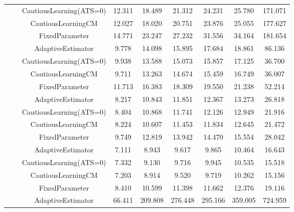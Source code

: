 \begin{table}[!h]
\begin{tabular}[t]{ccccccccc}
 &  & CautiousLearning(ATS=0) & 12.311 & 18.489 & 21.312 & 24.231 & 25.780 & 171.071\\

 &  & CautiousLearningCM & 12.027 & 18.020 & 20.751 & 23.876 & 25.055 & 177.627\\

 & \multirow[t]{-4}{*}{\centering\arraybackslash 0.75} & FixedParameter & 14.771 & 23.247 & 27.232 & 31.556 & 34.164 & 181.654\\
\cmidrule{2-9}
 &  & AdaptiveEstimator & 9.778 & 14.098 & 15.895 & 17.684 & 18.861 & 86.136\\

 &  & CautiousLearning(ATS=0) & 9.938 & 13.588 & 15.073 & 15.857 & 17.125 & 36.700\\

 &  & CautiousLearningCM & 9.711 & 13.263 & 14.674 & 15.459 & 16.749 & 36.007\\

 & \multirow[t]{-4}{*}{\centering\arraybackslash 1.00} & FixedParameter & 11.713 & 16.383 & 18.309 & 19.550 & 21.238 & 52.214\\
\cmidrule{2-9}
 &  & AdaptiveEstimator & 8.217 & 10.843 & 11.851 & 12.367 & 13.273 & 26.818\\

 &  & CautiousLearning(ATS=0) & 8.404 & 10.868 & 11.741 & 12.126 & 12.949 & 21.916\\

 &  & CautiousLearningCM & 8.224 & 10.607 & 11.453 & 11.834 & 12.645 & 21.472\\

 & \multirow[t]{-4}{*}{\centering\arraybackslash 1.25} & FixedParameter & 9.749 & 12.819 & 13.942 & 14.470 & 15.554 & 28.042\\
\cmidrule{2-9}
 &  & AdaptiveEstimator & 7.111 & 8.943 & 9.617 & 9.865 & 10.464 & 16.643\\

 &  & CautiousLearning(ATS=0) & 7.332 & 9.130 & 9.716 & 9.945 & 10.535 & 15.518\\

 &  & CautiousLearningCM & 7.203 & 8.914 & 9.520 & 9.719 & 10.262 & 15.156\\

\multirow[t]{-28}{*}{\centering\arraybackslash 1} & \multirow[t]{-4}{*}{\centering\arraybackslash 1.50} & FixedParameter & 8.410 & 10.599 & 11.398 & 11.662 & 12.376 & 19.116\\
\cmidrule{1-9}
 &  & AdaptiveEstimator & 66.411 & 209.808 & 276.448 & 295.166 & 359.005 & 724.959\\


\end{tabular}
\end{table}
